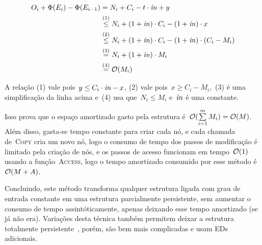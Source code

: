 \documentclass[../../main.tex]{subfiles}
\begin{document}
\begin{align*}
	O_i + \Phi(E_i) - \Phi(E_{i-1}) & = N_i + C_i - t \cdot \mathit{in} + y
	\\ &\stackrel{\text{(1)}}{\leq} N_i + (1 + \mathit{in})\cdot C_i - (1 + \mathit{in}) \cdot x
	\\ &\stackrel{\text{(2)}}{\leq} N_i + (1 + \mathit{in})\cdot C_i - (1 + \mathit{in}) \cdot (C_i - M_i)
	\\ &\stackrel{\text{(3)}}{=} N_i + (1 + \mathit{in}) \cdot M_i
	\\ &\stackrel{\text{(4)}}{=} \mathcal{O}(M_i)
\end{align*}

A relação (1) vale pois~$y \leq C_i \cdot \mathit{in} - x$, (2) vale pois~$x \geq C_i - M_i$,~(3) é uma simplificação da linha acima e~(4) usa que~$N_i \leq M_i$ e~$\mathit{in}$ é uma constante.

Isso prova que o espaço amortizado gasto pela estrutura é~${\mathcal{O}(\sum\limits_{i=1}^m{M_i}) = \mathcal{O}(M)}$. Além disso, gasta-se tempo constante para criar cada nó, e cada chamada de~\textsc{Copy} cria um novo nó, logo o consumo de tempo dos passos de modificação é limitado pela criação de nós, e os passos de acesso funcionam em tempo~$\mathcal{O}(1)$ usando a função~\textsc{Access}, logo o tempo amortizado consumido por esse método é~$\mathcal{O}(M+A)$.

Concluindo, este método transforma qualquer estrutura ligada com grau de entrada constante em uma estrutura parcialmente persistente, sem aumentar o consumo de tempo assintóticamente, apenas deixando esse tempo amortizado (se já não era). Variações desta técnica também permitem deixar a estrutura totalmente persistente~\cite{DriscollSST1989}, porém, são bem mais complicadas e usam EDs adicionais.
\end{document}
